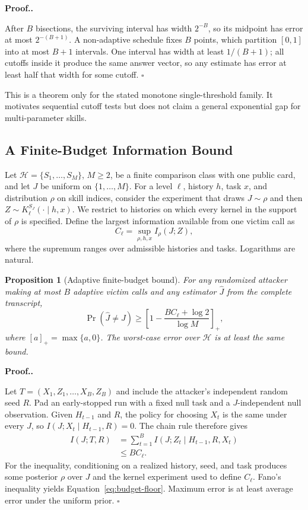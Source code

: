 \documentclass[letterpaper,twocolumn,10pt]{article}
\newtheorem{proposition}{Proposition}[section]
\newcommand{\paragraphtitle}[1]{%
  \vspace{5pt}\noindent\textbf{#1.}%
}
\begin{document}
\paragraphtitle{Proof.}
After $B$ bisections, the surviving interval has width $2^{-B}$, so its midpoint
has error at most $2^{-(B+1)}$.  A non-adaptive schedule fixes $B$ points, which
partition $[0,1]$ into at most $B+1$ intervals.  One interval has width at least
$1/(B+1)$; all cutoffs inside it produce the same answer vector, so any estimate
has error at least half that width for some cutoff.  \hfill$\square$

This is a theorem only for the stated monotone single-threshold family.  It
motivates sequential cutoff tests but does not claim a general exponential gap
for multi-parameter skills.

\subsection{A Finite-Budget Information Bound}

Let $\mathcal{H}=\{S_1,\ldots,S_M\}$, $M\ge2$, be a finite comparison class with
one public card, and let $J$ be uniform on $\{1,\ldots,M\}$.  For a level $\ell$,
history $h$, task $x$, and distribution $\rho$ on skill indices, consider the
experiment that draws $J\sim\rho$ and then
$Z\sim K_\ell^{S_J}(\cdot\mid h,x)$.  We restrict to histories on which every
kernel in the support of $\rho$ is specified.  Define the largest information
available from one victim call as
\begin{equation}
  C_\ell=\sup_{\rho,h,x} I_\rho(J;Z),
  \label{eq:per-call-capacity}
\end{equation}
where the supremum ranges over admissible histories and tasks.  Logarithms are
natural.

\begin{proposition}[Adaptive finite-budget bound]
\label{prop:budget}
For any randomized attacker making at most $B$ adaptive victim calls and any
estimator $\widehat J$ from the complete transcript,
\begin{equation}
  \Pr(\widehat J\ne J)
  \ge
  \left[1-\frac{B C_\ell+\log 2}{\log M}\right]_+,
  \label{eq:budget-floor}
\end{equation}
where $[a]_+=\max\{a,0\}$.  The worst-case error over
$\mathcal{H}$ is at least the same bound.
\end{proposition}

\paragraphtitle{Proof.}
Let $T=(X_1,Z_1,\ldots,X_B,Z_B)$ and include the attacker's independent random
seed $R$.  Pad an early-stopped run with a fixed null task and a
$J$-independent null observation.  Given $H_{t-1}$ and $R$, the policy for
choosing $X_t$ is the same under every $J$, so
$I(J;X_t\mid H_{t-1},R)=0$.  The chain rule therefore gives
\begin{align*}
  I(J;T,R)
    &=\sum_{t=1}^{B} I(J;Z_t\mid H_{t-1},R,X_t)\\
    &\le B C_\ell.
\end{align*}
For the inequality, conditioning on a realized history, seed, and task produces
some posterior $\rho$ over $J$ and the kernel experiment used to define
$C_\ell$.
Fano's inequality yields Equation~\ref{eq:budget-floor}.  Maximum error is at
least average error under the uniform prior.  \hfill$\square$
\end{document}
